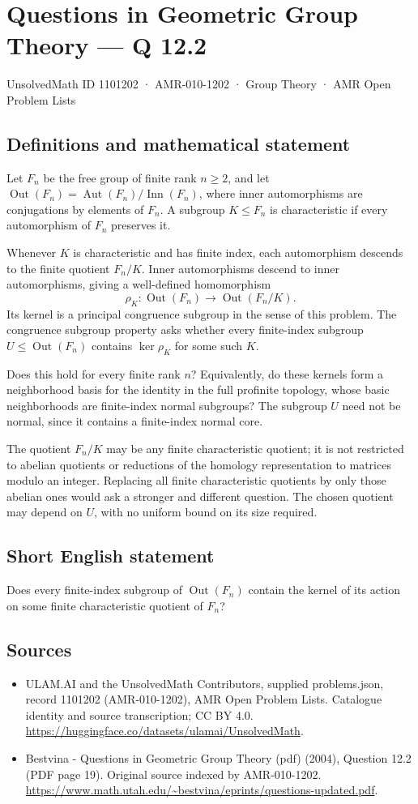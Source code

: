 \documentclass[11pt,a4paper]{article}
\begin{document}
\section*{Questions in Geometric Group Theory — Q 12.2}\label{1101202}
{\small UnsolvedMath ID 1101202 · AMR-010-1202 · Group Theory · AMR Open Problem Lists}
\subsection{Definitions and mathematical statement}
Let $F_n$ be the free group of finite rank $n\geq2$, and let
$\operatorname{Out}(F_n)=\operatorname{Aut}(F_n)/\operatorname{Inn}(F_n)$, where inner automorphisms are conjugations by elements of $F_n$. A subgroup $K\leq F_n$ is characteristic if every automorphism of $F_n$ preserves it.

Whenever $K$ is characteristic and has finite index, each automorphism descends to the finite quotient $F_n/K$. Inner automorphisms descend to inner automorphisms, giving a well-defined homomorphism
\[
 \rho_K:\operatorname{Out}(F_n)\longrightarrow
                     \operatorname{Out}(F_n/K).
\]
Its kernel is a principal congruence subgroup in the sense of this problem. The congruence subgroup property asks whether every finite-index subgroup $U\leq\operatorname{Out}(F_n)$ contains $\ker\rho_K$ for some such $K$.

Does this hold for every finite rank $n$? Equivalently, do these kernels form a neighborhood basis for the identity in the full profinite topology, whose basic neighborhoods are finite-index normal subgroups? The subgroup $U$ need not be normal, since it contains a finite-index normal core.

The quotient $F_n/K$ may be any finite characteristic quotient; it is not restricted to abelian quotients or reductions of the homology representation to matrices modulo an integer. Replacing all finite characteristic quotients by only those abelian ones would ask a stronger and different question. The chosen quotient may depend on $U$, with no uniform bound on its size required.
\subsection{Short English statement}
Does every finite-index subgroup of $\operatorname{Out}(F_n)$ contain the kernel of its action on some finite characteristic quotient of $F_n$?
\subsection{Sources}
\begin{itemize}
\item[S1] ULAM.AI and the UnsolvedMath Contributors, supplied problems.json, record 1101202 (AMR-010-1202), AMR Open Problem Lists. Catalogue identity and source transcription; CC BY 4.0.
\url{https://huggingface.co/datasets/ulamai/UnsolvedMath}.
\item[S2] Bestvina - Questions in Geometric Group Theory (pdf) (2004), Question 12.2 (PDF page 19). Original source indexed by AMR-010-1202.
\url{https://www.math.utah.edu/~bestvina/eprints/questions-updated.pdf}.
\end{itemize}
\end{document}
